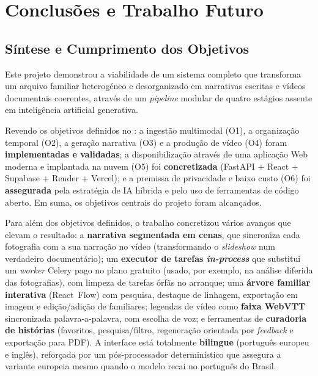 \chapter{Conclusões e Trabalho Futuro}
\label{cap:conclusoes}

\section{Síntese e Cumprimento dos Objetivos}
\label{sec:sintese}

Este projeto demonstrou a viabilidade de um sistema completo que
transforma um arquivo familiar heterogéneo e desorganizado em narrativas
escritas e vídeos documentais coerentes, através de um \emph{pipeline}
modular de quatro estágios assente em inteligência artificial generativa.

Revendo os objetivos definidos no : a ingestão
multimodal (O1), a organização temporal (O2), a geração narrativa (O3) e
a produção de vídeo (O4) foram \textbf{implementadas e validadas}; a
disponibilização através de uma aplicação Web moderna e implantada na
nuvem (O5) foi \textbf{concretizada} (FastAPI + React + Supabase + Render +
Vercel); e a premissa de privacidade e baixo custo (O6) foi
\textbf{assegurada} pela estratégia de IA híbrida e pelo uso de
ferramentas de código aberto. Em suma, os objetivos centrais do projeto
foram alcançados.

Para além dos objetivos definidos, o trabalho concretizou vários avanços
que elevam o resultado: a \textbf{narrativa segmentada em cenas}, que
sincroniza cada fotografia com a sua narração no vídeo (transformando o
\emph{slideshow} num verdadeiro documentário); um \textbf{executor de
tarefas \emph{in-process}} que substitui um \emph{worker} Celery pago no
plano gratuito (usado, por exemplo, na análise diferida das fotografias),
com limpeza de tarefas órfãs no arranque; uma \textbf{árvore familiar
interativa} (React~Flow) com pesquisa, destaque de linhagem, exportação em
imagem e edição/adição de familiares; legendas de vídeo como \textbf{faixa
WebVTT} sincronizada palavra-a-palavra, com escolha de voz; e ferramentas
de \textbf{curadoria de histórias} (favoritos, pesquisa/filtro,
regeneração orientada por \emph{feedback} e exportação para PDF). A
interface está totalmente \textbf{bilingue} (português europeu e inglês),
reforçada por um pós-processador determinístico que assegura a variante
europeia mesmo quando o modelo recai no português do Brasil.

